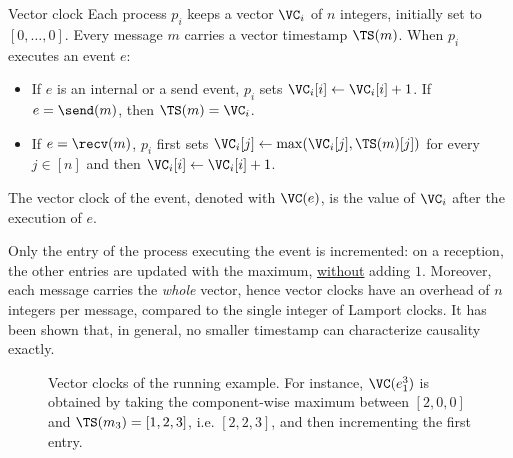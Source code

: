 \begin{frameddefn}{Vector clock}
  Each process $p_i$ keeps a vector $\VC_i$ of $n$ integers, initially set to $[0, \ldots, 0]$. Every message $m$ carries a vector timestamp $\TS(m)$. When $p_i$ executes an event $e$:
  \begin{itemize}
    \item If $e$ is an internal or a send event, $p_i$ sets $\VC_i[i] \leftarrow \VC_i[i] + 1$. If $e = \send(m)$, then $\TS(m) = \VC_i$.
    \item If $e = \recv(m)$, $p_i$ first sets $\VC_i[j] \leftarrow \max(\VC_i[j], \TS(m)[j])$ for every $j \in [n]$ and then $\VC_i[i] \leftarrow \VC_i[i] + 1$.
  \end{itemize}
  The vector clock of the event, denoted with $\VC(e)$, is the value of $\VC_i$ after the execution of $e$.
\end{frameddefn}

\begin{framedobs}{}
  Only the entry of the process executing the event is incremented: on a reception, the other entries are updated with the maximum, \underline{without} adding $1$. Moreover, each message carries the \textit{whole} vector, hence vector clocks have an overhead of $n$ integers per message, compared to the single integer of Lamport clocks. It has been shown that, in general, no smaller timestamp can characterize causality exactly.
\end{framedobs}

\begin{figure}[H]
  \centering
  \caption{Vector clocks of the running example. For instance, $\VC(e_1^3)$ is obtained by taking the component-wise maximum between $[2,0,0]$ and $\TS(m_3) = [1,2,3]$, i.e. $[2,2,3]$, and then incrementing the first entry.}
  \label{fig:vector}
\end{figure}

